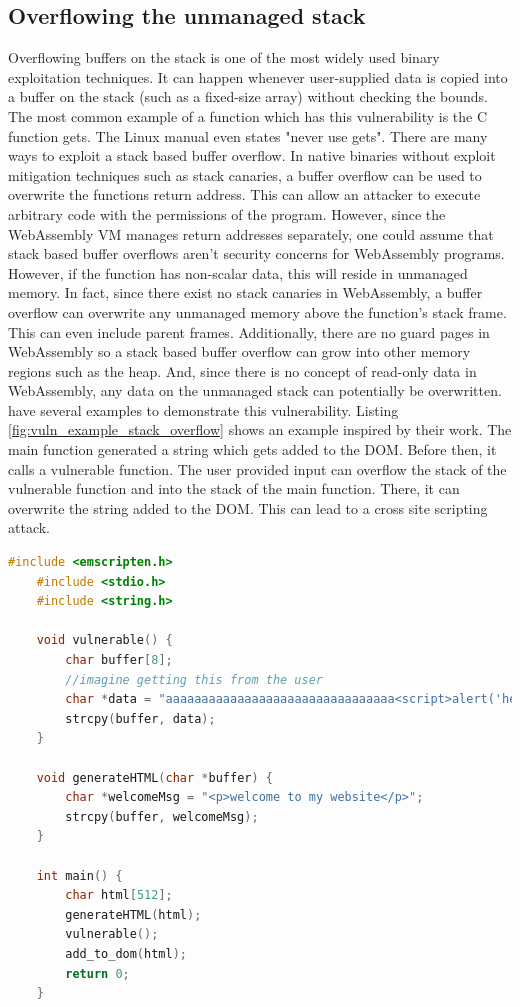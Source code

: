 \documentclass[sigconf]{acmart}
\begin{document}
\subsection{Overflowing the unmanaged stack}
\label{sec:stack_buffer_overflow}
Overflowing buffers on the stack is one of the most widely used binary exploitation techniques. It can happen whenever user-supplied data is copied into a buffer on the stack (such as a fixed-size array) without checking the bounds. The most common example of a function which has this vulnerability is the C function gets. The Linux manual even states "never use gets". There are many ways to exploit a stack based buffer overflow. In native binaries without exploit mitigation techniques such as stack canaries, a buffer overflow can be used to overwrite the functions return address. This can allow an attacker to execute arbitrary code with the permissions of the program. However, since the WebAssembly VM manages return addresses separately, one could assume that stack based buffer overflows aren't security concerns for WebAssembly programs. However, if the function has non-scalar data, this will reside in unmanaged memory. In fact, since there exist no stack canaries in WebAssembly, a buffer overflow can overwrite any unmanaged memory above the function's stack frame. This can even include parent frames. Additionally, there are no guard pages in WebAssembly so a stack based buffer overflow can grow into other memory regions such as the heap. And, since there is no concept of read-only data in WebAssembly, any data on the unmanaged stack can potentially be overwritten. \cite{lehmann_everything_2020} have several examples to demonstrate this vulnerability. Listing \ref{fig:vuln_example_stack_overflow} shows an example inspired by their work. The main function generated a string which gets added to the DOM. Before then, it calls a vulnerable function. The user provided input can overflow the stack of the vulnerable function and into the stack of the main function. There, it can overwrite the string added to the DOM. This can lead to a cross site scripting attack. 
\newpage

\begin{lstlisting}[language=C++, caption={This C program has a stack overflow vulnerability. This can be exploited by the user supplying a buffer which overflows into the parent frame and replaces the string meant to be added to the DOM.}, label={fig:vuln_example_stack_overflow}]
	#include <emscripten.h>
	#include <stdio.h>
	#include <string.h>

	void vulnerable() {
		char buffer[8];
		//imagine getting this from the user
		char *data = "aaaaaaaaaaaaaaaaaaaaaaaaaaaaaaaa<script>alert('hello')</script>";
		strcpy(buffer, data);
	}

	void generateHTML(char *buffer) {
		char *welcomeMsg = "<p>welcome to my website</p>";
		strcpy(buffer, welcomeMsg);
	}

	int main() {
		char html[512];
		generateHTML(html);
		vulnerable();
		add_to_dom(html);
		return 0;
	}
\end{lstlisting}
\end{document}
